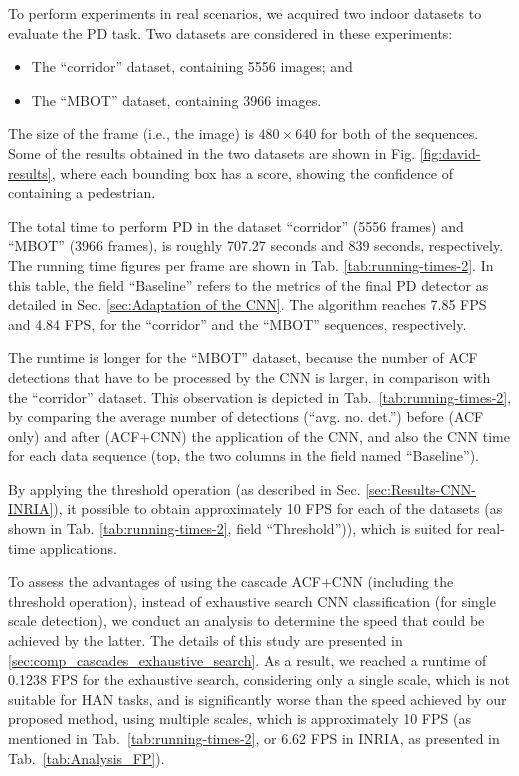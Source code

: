 \documentclass[5p,time]{elsarticle}
\begin{document}
To perform experiments in real scenarios, we acquired two indoor datasets to evaluate the PD task.
Two datasets are considered in these experiments:
\begin{itemize}
	\item{The ``corridor'' dataset, containing 5556 images; and} 
	\item{The ``MBOT'' dataset, containing 3966 images.} 
\end{itemize}
The size of the frame (i.e., the image) is $480\times 640$ for both of the sequences. Some of the results obtained in the two datasets are shown in Fig. \ref{fig:david-results}, where each bounding box has a score, showing the confidence of containing a pedestrian.

The total time to perform PD in the dataset ``corridor'' (5556 frames) and ``MBOT'' (3966 frames), is  roughly  707.27 seconds and 839 seconds, respectively. The running time figures per frame are shown in Tab. \ref{tab:running-times-2}. In this table, the field ``Baseline'' refers to the metrics of the final PD detector as detailed in Sec. \ref{sec:Adaptation of the CNN}. The algorithm reaches 7.85 FPS and 4.84 FPS, for the ``corridor'' and the ``MBOT'' sequences, respectively.


The runtime is longer for the ``MBOT'' dataset, because the number of ACF detections that have to be processed by the CNN is larger, in comparison with the ``corridor'' dataset. This observation is depicted in Tab.~\ref{tab:running-times-2}, by comparing the average number of detections (``avg. no. det.'') before (ACF only) and after (ACF+CNN) the application of the CNN, and also the CNN time for each data sequence (top, the two columns in the field named ``Baseline'').

By applying the threshold operation (as described in Sec. \ref{sec:Results-CNN-INRIA}), it possible to obtain approximately 10 FPS for each of the datasets (as shown in Tab. \ref{tab:running-times-2}, field   ``Threshold'')), which is suited for real-time applications.

To assess the advantages of using the cascade ACF+CNN (including the threshold operation), instead of exhaustive search CNN classification (for single scale detection), we conduct an analysis to determine the speed that could be achieved by the latter. The details of this study are presented in \ref{sec:comp_cascades_exhaustive_search}. As a result, we reached a runtime of 0.1238 FPS for the exhaustive search, considering only a single scale, which is not suitable for HAN tasks, and is significantly worse than the speed achieved by our proposed method, using multiple scales, which is approximately 10 FPS (as mentioned in Tab.~\ref{tab:running-times-2}, or 6.62 FPS in INRIA, as presented in Tab.~\ref{tab:Analysis_FP}).
\end{document}
